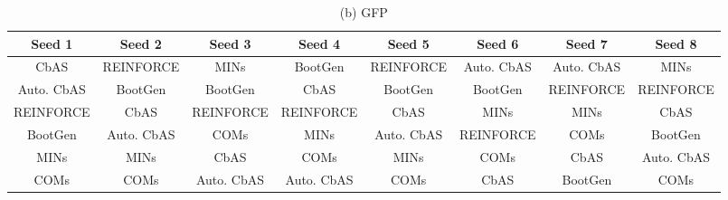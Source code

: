 \begin{table*}[h!]
\begin{minipage}{.9\textwidth}
      \label{tab:utr_methos}
    \end{minipage}%
    \hfill
    \centering
    \begin{minipage}{.9\textwidth}
      \centering
      \caption*{(b) GFP}
      \begin{adjustbox}{width=\linewidth,center}
      \begin{tabular}{|c|c|c|c|c|c|c|c|}
        \toprule
            \textbf{Seed 1}                                           & \textbf{Seed 2}                                        & \textbf{Seed 3}                                          & \textbf{Seed 4}                    & \textbf{Seed 5} & \textbf{Seed 6} & \textbf{Seed 7} & \textbf{Seed 8}                                      \\ \midrule 
            \cellcolor[HTML]{FCE5CD}CbAS & \cellcolor[HTML]{FFF2CC}REINFORCE & \cellcolor[HTML]{D0E0E3}MINs & \cellcolor[HTML]{E6B8AF}BootGen & \cellcolor[HTML]{FFF2CC}REINFORCE & \cellcolor[HTML]{D9EAD3}Auto. CbAS & \cellcolor[HTML]{D9EAD3}Auto. CbAS & \cellcolor[HTML]{D0E0E3}MINs \\ 
\cellcolor[HTML]{D9EAD3}Auto. CbAS & \cellcolor[HTML]{E6B8AF}BootGen & \cellcolor[HTML]{E6B8AF}BootGen & \cellcolor[HTML]{FCE5CD}CbAS & \cellcolor[HTML]{E6B8AF}BootGen & \cellcolor[HTML]{E6B8AF}BootGen & \cellcolor[HTML]{FFF2CC}REINFORCE & \cellcolor[HTML]{FFF2CC}REINFORCE \\ 
\cellcolor[HTML]{FFF2CC}REINFORCE & \cellcolor[HTML]{FCE5CD}CbAS & \cellcolor[HTML]{FFF2CC}REINFORCE & \cellcolor[HTML]{FFF2CC}REINFORCE & \cellcolor[HTML]{FCE5CD}CbAS & \cellcolor[HTML]{D0E0E3}MINs & \cellcolor[HTML]{D0E0E3}MINs & \cellcolor[HTML]{FCE5CD}CbAS \\ 
\cellcolor[HTML]{E6B8AF}BootGen & \cellcolor[HTML]{D9EAD3}Auto. CbAS & \cellcolor[HTML]{C9DAF8}COMs  & \cellcolor[HTML]{D0E0E3}MINs & \cellcolor[HTML]{D9EAD3}Auto. CbAS & \cellcolor[HTML]{FFF2CC}REINFORCE & \cellcolor[HTML]{C9DAF8}COMs  & \cellcolor[HTML]{E6B8AF}BootGen \\ 
\cellcolor[HTML]{D0E0E3}MINs & \cellcolor[HTML]{D0E0E3}MINs & \cellcolor[HTML]{FCE5CD}CbAS & \cellcolor[HTML]{C9DAF8}COMs  & \cellcolor[HTML]{D0E0E3}MINs & \cellcolor[HTML]{C9DAF8}COMs  & \cellcolor[HTML]{FCE5CD}CbAS & \cellcolor[HTML]{D9EAD3}Auto. CbAS \\ 
\cellcolor[HTML]{C9DAF8}COMs  & \cellcolor[HTML]{C9DAF8}COMs  & \cellcolor[HTML]{D9EAD3}Auto. CbAS & \cellcolor[HTML]{D9EAD3}Auto. CbAS & \cellcolor[HTML]{C9DAF8}COMs  & \cellcolor[HTML]{FCE5CD}CbAS & \cellcolor[HTML]{E6B8AF}BootGen & \cellcolor[HTML]{C9DAF8}COMs  \\ 

\end{tabular}
\end{adjustbox}
\end{minipage}
\end{table*}
